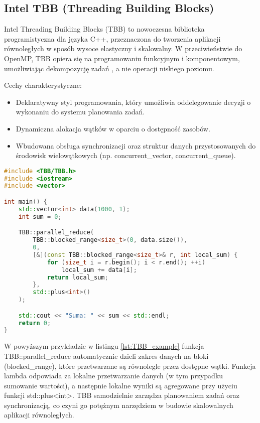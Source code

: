 \subsection{Intel TBB (Threading Building Blocks)}
Intel Threading Building Blocks (TBB) to nowoczesna biblioteka programistyczna dla języka C++, przeznaczona do tworzenia aplikacji równoległych w sposób wysoce elastyczny i skalowalny. W przeciwieństwie do OpenMP, TBB opiera się na programowaniu funkcyjnym i komponentowym, umożliwiając dekompozycję zadań , a nie operacji niskiego poziomu.

Cechy charakterystyczne:
\begin{itemize}
    \item Deklaratywny styl programowania, który umożliwia oddelegowanie decyzji o wykonaniu do systemu planowania zadań.
    \item Dynamiczna alokacja wątków w oparciu o dostępność zasobów.
    \item Wbudowana obsługa synchronizacji oraz struktur danych przystosowanych do środowisk wielowątkowych (np. concurrent\_vector, concurrent\_queue).
\end{itemize}

\begin{lstlisting}[language=C++, caption={Przykład użycia Intel TBB w C++}, label={lst:TBB_example}]
#include <TBB/TBB.h>
#include <iostream>
#include <vector>

int main() {
    std::vector<int> data(1000, 1);
    int sum = 0;

    TBB::parallel_reduce(
        TBB::blocked_range<size_t>(0, data.size()),
        0,
        [&](const TBB::blocked_range<size_t>& r, int local_sum) {
            for (size_t i = r.begin(); i < r.end(); ++i)
                local_sum += data[i];
            return local_sum;
        },
        std::plus<int>()
    );

    std::cout << "Suma: " << sum << std::endl;
    return 0;
}
\end{lstlisting}
W powyższym przykładzie w listingu \ref{lst:TBB_example} funkcja TBB::parallel\_reduce automatycznie dzieli zakres danych na bloki (blocked\_range), które przetwarzane są równolegle przez dostępne wątki. Funkcja lambda odpowiada za lokalne przetwarzanie danych (w tym przypadku sumowanie wartości), a następnie lokalne wyniki są agregowane przy użyciu funkcji std::plus<int>. TBB samodzielnie zarządza planowaniem zadań oraz synchronizacją, co czyni go potężnym narzędziem w budowie skalowalnych aplikacji równoległych.

